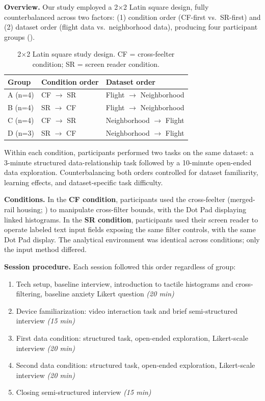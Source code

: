 \documentclass[12pt]{cmuthesis}
\begin{document}
\textbf{Overview.} Our study employed a 2$\times$2 Latin square design, fully counterbalanced across two factors: (1) condition order (CF-first vs.\ SR-first) and (2) dataset order (flight data vs.\ neighborhood data), producing four participant groups ().

\begin{table}[h]
\centering
\caption{2$\times$2 Latin square study design. CF = cross-feelter condition; SR = screen reader condition.}
\label{tab:design}
\begin{tabular}{@{}lll@{}}
\toprule
\textbf{Group} & \textbf{Condition order} & \textbf{Dataset order} \\
\midrule
A (n=4) & CF $\rightarrow$ SR & Flight $\rightarrow$ Neighborhood \\
B (n=4) & SR $\rightarrow$ CF & Flight $\rightarrow$ Neighborhood \\
C (n=4) & CF $\rightarrow$ SR & Neighborhood $\rightarrow$ Flight \\
D (n=3) & SR $\rightarrow$ CF & Neighborhood $\rightarrow$ Flight \\
\bottomrule
\end{tabular}
\end{table}

Within each condition, participants performed two tasks on the same dataset: a 3-minute structured data-relationship task followed by a 10-minute open-ended data exploration. Counterbalancing both orders controlled for dataset familiarity, learning effects, and dataset-specific task difficulty.

\textbf{Conditions.} In the \textbf{CF condition}, participants used the cross-feelter (merged-rail housing; ) to manipulate cross-filter bounds, with the Dot Pad displaying linked histograms. In the \textbf{SR condition}, participants used their screen reader to operate labeled text input fields exposing the same filter controls, with the same Dot Pad display. The analytical environment was identical across conditions; only the input method differed.

\textbf{Session procedure.} Each session followed this order regardless of group: 
\begin{enumerate}[itemsep=-0.5pt]
  \item Tech setup, baseline interview, introduction to tactile histograms and cross-filtering, baseline anxiety Likert question \textit{(20 min)}
  \item Device familiarization: video interaction task and brief semi-structured interview \textit{(15 min)}
  \item First data condition: structured task, open-ended exploration, Likert-scale interview \textit{(20 min)}
  \item Second data condition: structured task, open-ended exploration, Likert-scale interview \textit{(20 min)}
  \item Closing semi-structured interview \textit{(15 min)}
\end{enumerate}
\end{document}
